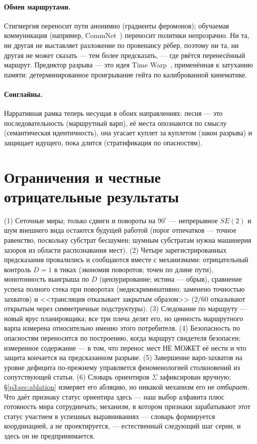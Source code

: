 \documentclass{article}
\begin{document}
\paragraph{Обмен маршрутами.} Стигмергия переносит пути анонимно
(градиенты феромонов); обучаемая коммуникация (например,
CommNet~\cite{sukhbaatar2016commnet}) переносит политики непрозрачно.
Ни та, ни другая не выставляет разложение по провенансу рёбер, поэтому
ни та, ни другая не может сказать --- тем более предсказать, --- где
рвётся перенесённый маршрут. Предиктор разрыва --- это идея Time
Warp~\cite{jefferson1985}, применённая к затуханию памяти:
детерминированное проигрывание гейта по калиброванной кинематике.
\paragraph{Сонглайны.} Нарративная рамка теперь несущая в обоих
направлениях: песня --- это последовательность (маршрутный варп), её
места опознаются по смыслу (семантическая идентичность), она угасает
куплет за куплетом (закон разрыва) и защищает идущего, пока длится
(стратификация по опасностям).

\section{Ограничения и честные отрицательные результаты}
\label{p3:sec:limits}

(1) Сеточные миры; только сдвиги и повороты на $90^\circ$ ---
непрерывное $SE(2)$ и шум внешнего вида остаются будущей работой
(порог отпечатков --- точное равенство, поскольку субстрат бесшумен;
шумным субстратам нужна машинерия зазоров из области распознавания
мест). (2) Четыре зарегистрированных предсказания провалились и
сообщаются вместе с механизмами: отрицательный контроль $D{=}1$ в
тиках (экономия поворотов; точен по длине пути), монотонность выигрыша
по $D$ (цензурирование; истина --- обрыв), сравнение успеха полного
стека при поворотах (недискриминативно; заменено точностью захватов) и
<<трансляция отказывает закрытым образом>> ($2/60$ отказывают открытым
через симметричные подструктуры). (3) Следование по маршруту --- новый
ярус планировщика; все три плеча делят его, но ценность маршрутного
варпа измерена относительно именно этого потребителя. (4) Безопасность
по опасностям переносится по построению, когда маршрут свидетеля
безопасен; измеренное содержание --- в том, что перенос мест НЕ МОЖЕТ
её нести и что защита кончается на предсказанном разрыве. (5)
Завершение варп-захватов на уровне дефицита по-прежнему управляется
феноменологией столкновений из сопутствующей статьи. (6) Словарь
ориентиров $\Sigma$ зафиксирован вручную; \S\ref{p3:sec:ablation}
измеряет его абляцию, но никакой механизм его не \emph{отбирает}. Что
даёт признаку статус ориентира здесь --- наш выбор алфавита плюс
готовность мира сотрудничать; механизм, в котором признаки
зарабатывают этот статус участием в успешных выравниваниях --- словарь
формируется координацией, а не проектируется, --- естественный
следующий шаг серии, и здесь он не предпринимается.
\end{document}
